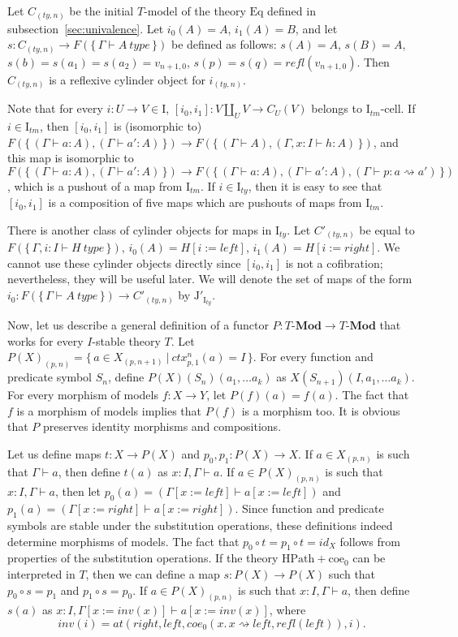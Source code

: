 \documentclass{mscs}
\newcommand{\repl}{:=}
\newcommand{\idtype}{\rightsquigarrow}
\newcommand{\coe}{\mathrm{coe}}
\newcommand{\HPath}{\mathrm{HPath}}
\newcommand{\Eq}{\mathrm{Eq}}
\newcommand{\cat}[1]{\mathbf{#1}}
\newcommand{\Mod}[1]{#1\text{-}\cat{Mod}}
\newcommand{\I}{\mathrm{I}}
\newcommand{\J}{\mathrm{J}}
\newcommand{\class}[2]{#1\text{-}\mathrm{#2}}
\newcommand{\Icell}[1][\I]{\class{#1}{cell}}
\newcommand{\cyli}{i}
\numberwithin{figure}{section}
\begin{document}
Let $C_{(ty,n)}$ be the initial $T$-model of the theory $\Eq$ defined in subsection~\ref{sec:univalence}.
Let $\cyli_0(A) = A$, $\cyli_1(A) = B$, and let $s : C_{(ty,n)} \to F(\{\,\Gamma \vdash A\ type\,\})$ be defined as follows:
$s(A) = A$, $s(B) = A$, $s(b) = s(a_1) = s(a_2) = v_{n+1,0}$, $s(p) = s(q) = refl(v_{n+1,0})$.
Then $C_{(ty,n)}$ is a reflexive cylinder object for $i_{(ty,n)}$.

Note that for every $i : U \to V \in \I$, $[\cyli_0,\cyli_1] : V \amalg_U V \to C_U(V)$ belongs to $\Icell[\I_{tm}]$.
If $i \in \I_{tm}$, then $[\cyli_0,\cyli_1]$ is (isomorphic to) $F(\{\,(\Gamma \vdash a : A), (\Gamma \vdash a' : A)\,\}) \to F(\{\,(\Gamma \vdash A), (\Gamma, x : I \vdash h : A)\,\})$,
and this map is isomorphic to $F(\{\,(\Gamma \vdash a : A), (\Gamma \vdash a' : A)\,\}) \to F(\{\,(\Gamma \vdash a : A), (\Gamma \vdash a' : A), (\Gamma \vdash p : a \idtype a')\,\})$,
which is a pushout of a map from $\I_{tm}$.
If $i \in \I_{ty}$, then it is easy to see that $[\cyli_0,\cyli_1]$ is a composition of five maps which are pushouts of maps from $\I_{tm}$.

There is another class of cylinder objects for maps in $\I_{ty}$.
Let $C'_{(ty,n)}$ be equal to $F(\{\,\Gamma, i : I \vdash H\ type\,\})$, $\cyli_0(A) = H[i \repl left]$, $\cyli_1(A) = H[i \repl right]$.
We cannot use these cylinder objects directly since $[\cyli_0,\cyli_1]$ is not a cofibration; nevertheless, they will be useful later.
We will denote the set of maps of the form $\cyli_0 : F(\{\,\Gamma \vdash A\ type\,\}) \to C'_{(ty,n)}$ by $\J'_{\I_{ty}}$.

Now, let us describe a general definition of a functor $P : \Mod{T} \to \Mod{T}$ that works for every $I$-stable theory $T$.
Let $P(X)_{(p,n)} = \{\,a \in X_{(p,n+1)}\ |\ ctx^n_{p,1}(a) = I\,\}$.
For every function and predicate symbol $S_n$, define $P(X)(S_n)(a_1, \ldots a_k)$ as $X(S_{n+1})(I, a_1, \ldots a_k)$.
For every morphism of models $f : X \to Y$, let $P(f)(a) = f(a)$.
The fact that $f$ is a morphism of models implies that $P(f)$ is a morphism too.
It is obvious that $P$ preserves identity morphisms and compositions.

Let us define maps $t : X \to P(X)$ and $p_0,p_1 : P(X) \to X$.
If $a \in X_{(p,n)}$ is such that $\Gamma \vdash a$, then define $t(a)$ as $x : I, \Gamma \vdash a$.
If $a \in P(X)_{(p,n)}$ is such that $x : I, \Gamma \vdash a$, then let $p_0(a) = (\Gamma[x \repl left] \vdash a[x \repl left])$
and $p_1(a) = (\Gamma[x \repl right] \vdash a[x \repl right])$.
Since function and predicate symbols are stable under the substitution operations, these definitions indeed determine morphisms of models.
The fact that $p_0 \circ t = p_1 \circ t = id_X$ follows from properties of the substitution operations.
If the theory $\HPath + \coe_0$ can be interpreted in $T$, then we can define a map $s : P(X) \to P(X)$ such that $p_0 \circ s = p_1$ and $p_1 \circ s = p_0$.
If $a \in P(X)_{(p,n)}$ is such that $x : I, \Gamma \vdash a$, then define $s(a)$ as $x : I, \Gamma[x \repl inv(x)] \vdash a[x \repl inv(x)]$, where
\[ inv(i) = at(right, left, coe_0(x.\,x \idtype left, refl(left)), i). \]
\end{document}
